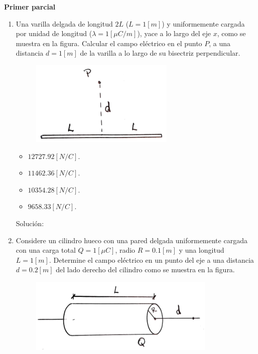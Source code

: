 \documentclass[letter,11pt]{article}
\begin{document}
\begin{center}
    {\Large \bf{Primer parcial}}
\end{center}

\noindent{}

\vspace{0.5cm}

\begin{enumerate}
\item Una varilla delgada de longitud $2L$ ($L = 1 [m]$) y uniformemente cargada
por unidad de longitud ($\lambda = 1 [\mu C/m]$), yace a lo largo del eje $x$,
como se muestra en la figura. Calcular el campo eléctrico en el punto $P$, a una
distancia $d = 1 [m]$ de la varilla a lo largo de su bisectriz perpendicular.

\begin{figure}[!h]
\centering
\includegraphics[scale=1.60]{resources/q1.eps}
\end{figure}

\begin{itemize}
    \item $12727.92 [N/C]$.
    \item $11462.36 [N/C]$.
    \item $10354.28 [N/C]$.
    \item $ 9658.33 [N/C]$.
\end{itemize}

Solución: \\

\item Considere un cilindro hueco con una pared delgada uniformemente cargada
con una carga total $Q = 1 [\mu C]$, radio $R = 0.1 [m]$ y una longitud
$L = 1 [m]$. Determine el campo eléctrico en un punto del eje a una distancia
$d = 0.2 [m]$ del lado derecho del cilindro como se muestra en la figura.

\begin{figure}[!h]
\centering
\includegraphics[scale=1.80]{resources/q2.eps}
\end{figure}


\end{enumerate}
\end{document}
